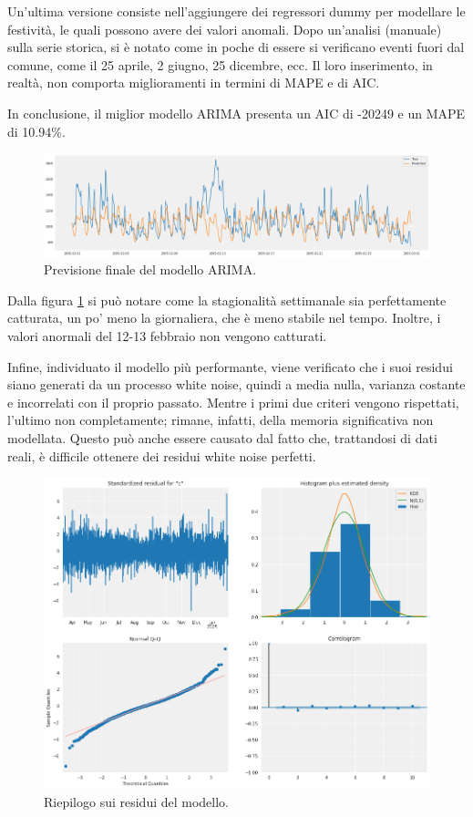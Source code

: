 Un'ultima versione consiste nell'aggiungere dei regressori dummy per modellare le festività, le quali possono avere dei valori anomali. Dopo un'analisi (manuale) sulla serie storica, si è notato come in poche di essere si verificano eventi fuori dal comune, come il 25 aprile, 2 giugno, 25 dicembre, ecc. Il loro inserimento, in realtà, non comporta miglioramenti in termini di MAPE e di AIC. 

In conclusione, il miglior modello ARIMA presenta un AIC di -20249 e un MAPE di 10.94\%. 

\begin{figure}[H]
\centering
\includegraphics[width=14cm]{Pictures/prediction_arima.png}
\caption{Previsione finale del modello ARIMA.}
\label{plot_arima}
\end{figure}

Dalla figura \ref{plot_arima} si può notare come la stagionalità settimanale sia perfettamente catturata, un po' meno la giornaliera, che è meno stabile nel tempo. Inoltre, i valori anormali del 12-13 febbraio non vengono catturati. 

Infine, individuato il modello più performante, viene verificato che i suoi residui siano generati da un processo white noise, quindi a media nulla, varianza costante e incorrelati con il proprio passato. Mentre i primi due criteri vengono rispettati, l'ultimo non completamente; rimane, infatti, della memoria significativa non modellata. Questo può anche essere causato dal fatto che, trattandosi di dati reali, è difficile ottenere dei residui white noise perfetti.

\vspace{0.5cm}

\begin{figure}[H]
\centering
\includegraphics[width=12cm]{Pictures/summary_arima.png}
\caption{Riepilogo sui residui del modello.}
\end{figure}

